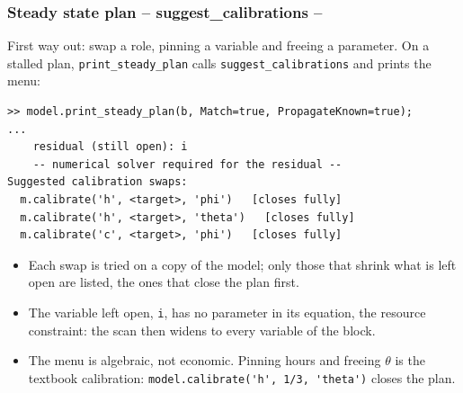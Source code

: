 \documentclass[10pt,slidestop]{beamer}
\theoremstyle{plain}
\begin{document}
\begin{frame}[fragile]
  \frametitle{Steady state plan -- suggest\_calibrations --}

  First way out: swap a role, pinning a variable and freeing a parameter. On a
  stalled plan, \verb+print_steady_plan+ calls \verb+suggest_calibrations+ and prints
  the menu:

  \begin{lstlisting}[style=MatlabConsole,basicstyle=\ttfamily\scriptsize]
>> model.print_steady_plan(b, Match=true, PropagateKnown=true);
...
    residual (still open): i
    -- numerical solver required for the residual --
Suggested calibration swaps:
  m.calibrate('h', <target>, 'phi')   [closes fully]
  m.calibrate('h', <target>, 'theta')   [closes fully]
  m.calibrate('c', <target>, 'phi')   [closes fully]
  \end{lstlisting}

  \begin{itemize}\small
  \item Each swap is tried on a copy of the model; only those that shrink what is
    left open are listed, the ones that close the plan first.
  \item The variable left open, \verb+i+, has no parameter in its equation, the
    resource constraint: the scan then widens to every variable of the block.
  \item The menu is algebraic, not economic. Pinning hours and freeing $\theta$ is
    the textbook calibration: \verb+model.calibrate('h', 1/3, 'theta')+ closes the
    plan.
  \end{itemize}

\end{frame}
\end{document}
